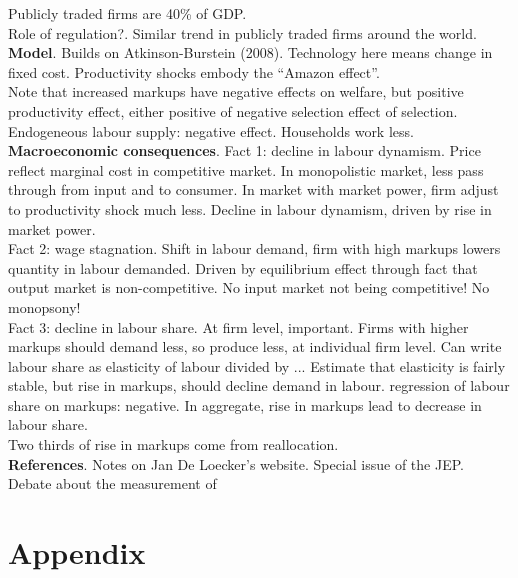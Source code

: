 \documentclass{amsart}
\theoremstyle{definition}
\theoremstyle{remark}
\numberwithin{equation}{section}
\begin{document}
Publicly traded firms are 40\% of GDP.\\

Role of regulation?. Similar trend in publicly traded firms around the world. \\

\textbf{Model}. Builds on Atkinson-Burstein (2008). Technology here means change in fixed cost. Productivity shocks embody the ``Amazon effect''.\\

Note that increased markups have negative effects on welfare, but positive productivity effect, either positive of negative selection effect of selection. Endogeneous labour supply: negative effect. Households work less.\\

\textbf{Macroeconomic consequences}. Fact 1: decline in labour dynamism. Price reflect marginal cost in competitive market. In monopolistic market, less pass through from input and to consumer. In market with market power, firm adjust to productivity shock much less. Decline in labour dynamism, driven by rise in market power.\\

Fact 2: wage stagnation. Shift in labour demand, firm with high markups lowers quantity in labour demanded. Driven by equilibrium effect through fact that output market is non-competitive. No input market not being competitive! No monopsony!\\

Fact 3: decline in labour share. At firm level, important. Firms with higher markups should demand less, so produce less, at individual firm level. Can write labour share as elasticity of labour divided by ... Estimate that elasticity is fairly stable, but rise in markups, should decline demand in labour. regression of labour share on markups: negative. In aggregate, rise in markups lead to decrease in labour share.\\

Two thirds of rise in markups come from reallocation.\\





\textbf{References}. Notes on Jan De Loecker's website. Special issue of the JEP.\\


Debate about the measurement of 

\newpage




\newpage

\section*{Appendix}
\end{document}
